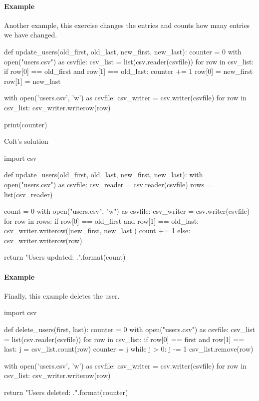 \paragraph{Example} Another example, this exercise changes the entries and counts how many entries we have changed. 
\begin{listing}{1}
def update_users(old_first, old_last, new_first, new_last):
    counter = 0
    with open("users.csv") as csvfile:
        csv_list = list(csv.reader(csvfile))
        for row in csv_list:
            if row[0] == old_first and row[1] == old_last:
                counter += 1
                row[0] = new_first
                row[1] = new_last    

        with open('users.csv', 'w') as csvfile:
            csv_writer = csv.writer(csvfile)
            for row in csv_list:
                csv_writer.writerow(row)

    print(counter)    
\end{listing}

Colt's solution 
\begin{listing}{1}
import csv

def update_users(old_first, old_last, new_first, new_last):
    with open("users.csv") as csvfile:
        csv_reader = csv.reader(csvfile)
        rows = list(csv_reader)
    
    count = 0
    with open("users.csv", "w") as csvfile:
        csv_writer = csv.writer(csvfile)
        for row in rows:
            if row[0] == old_first and row[1] == old_last:
                csv_writer.writerow([new_first, new_last])
                count += 1
            else:
                csv_writer.writerow(row)
    
    return "Users updated: {}.".format(count)    
\end{listing}


\paragraph{Example} Finally, this example deletes the user. 

\begin{listing}{1}
import csv

def delete_users(first, last):
    counter = 0
    with open("users.csv") as csvfile:
        csv_list = list(csv.reader(csvfile))
        for row in csv_list:
            if row[0] == first and row[1] == last:
                j = csv_list.count(row)
                counter = j
                while j > 0:
                    j -= 1
                    csv_list.remove(row)

        with open('users.csv', 'w') as csvfile:
            csv_writer = csv.writer(csvfile)
            for row in csv_list:
                csv_writer.writerow(row)

    return "Users deleted: {}.".format(counter)    
\end{listing}

